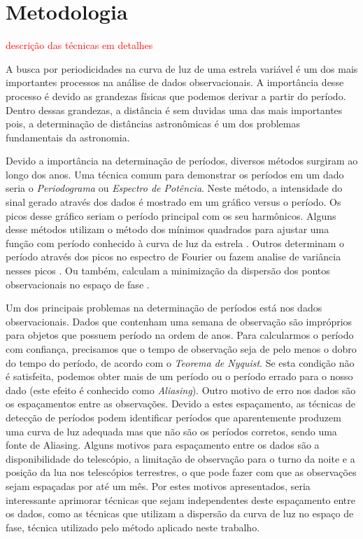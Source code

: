 \chapter{Metodologia}
\label{cap:tecnicas}
\textcolor{red}{descrição das técnicas em detalhes}


A busca por periodicidades na curva de luz de uma estrela variável é um dos mais importantes processos na análise de dados observacionais. A importância desse processo é devido as grandezas físicas que podemos derivar a partir do período. Dentro dessas grandezas, a distância é sem duvidas uma das mais importantes pois, a determinação de distâncias astronômicas é um dos problemas fundamentais da astronomia.

Devido a importância na determinação de períodos, diversos métodos surgiram ao longo dos anos. Uma técnica comum para demonstrar os períodos em um dado seria o \textit{Periodograma} ou \textit{Espectro de Potência}. Neste método, a intensidade do sinal gerado através dos dados é mostrado em um gráfico versus o período. Os picos desse gráfico seriam o período principal com os seu harmônicos. Alguns desse métodos utilizam o método dos mínimos quadrados para ajustar uma função com período conhecido à curva de luz da estrela \citep{lomb}. Outros determinam o período através dos picos no espectro de Fourier \citep{mello81} ou fazem analise de variância nesses picos \citep{aov}. Ou também, calculam a minimização da dispersão dos pontos observacionais no espaço de fase \citep{Cincotta1999, entropy, ce}.

Um dos principais problemas na determinação de períodos está nos dados observacionais. Dados que contenham uma semana de observação são impróprios para objetos que possuem período na ordem de anos. Para calcularmos o período com confiança, precisamos que o tempo de observação seja de pelo menos o dobro do tempo do período, de acordo com o \textit{Teorema de Nyquist}. Se esta condição não é satisfeita, podemos obter mais de um período ou o período errado para o nosso dado (este efeito é conhecido como \textit{Aliasing}). Outro motivo de erro nos dados são os espaçamentos entre as observações. Devido a estes espaçamento, as técnicas de detecção de períodos podem identificar períodos que aparentemente produzem uma curva de luz adequada mas que não são os períodos corretos, sendo uma fonte de Aliasing. Alguns motivos para espaçamento entre os dados são a disponibilidade do telescópio, a limitação de observação para o turno da noite e a posição da lua nos telescópios terrestres, o que pode fazer com que as observações sejam espaçadas por até um mês. Por estes motivos apresentados, seria interessante aprimorar técnicas que sejam independentes deste espaçamento entre os dados, como as técnicas que utilizam a dispersão da curva de luz no espaço de fase, técnica utilizado pelo método aplicado neste trabalho.


